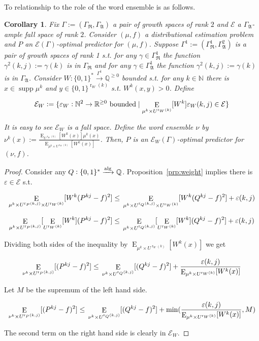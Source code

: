 \documentclass{article}
\numberwithin{equation}{section}
\theoremstyle{definition}
\theoremstyle{plain}
\newtheorem{corollary}{Corollary}[section]
\newcommand{\Words}{{\{ 0, 1 \}^*}}
\newcommand{\WordsLen}[1]{{\{ 0, 1 \}^{#1}}}
\DeclareMathOperator{\Supp}{supp}
\DeclareMathOperator{\E}{E}
\DeclareMathOperator{\R}{r}
\newcommand{\Nats}{\mathbb{N}}
\newcommand{\Rats}{\mathbb{Q}}
\newcommand{\Reals}{\mathbb{R}}
\newcommand{\GrowR}{\Gamma_{\mathfrak{R}}}
\newcommand{\GrowA}{\Gamma_{\mathfrak{A}}}
\newcommand{\Grow}{\Gamma:=(\GrowR,\GrowA)}
\newcommand{\Fall}{\mathcal{E}}
\newcommand{\Alg}{\xrightarrow{\textnormal{alg}}}
\begin{document}
To relationship to the role of the word ensemble is as follows.

\begin{samepage}
\begin{corollary}

Fix $\Grow$ a pair of growth spaces of rank $2$ and $\Fall$ a $\GrowA$-ample fall space of rank $2$. Consider $(\mu,f)$ a distributional estimation problem and $P$ an $\Fall(\Gamma)$-optimal predictor for $(\mu,f)$. Suppose $\Gamma^1:=(\GrowR^1,\GrowA^2)$ is a pair of growth spaces of rank 1 s.t. for any $\gamma \in \GrowR^1$ the function ${\gamma^2(k,j):=\gamma(k)}$ is in $\GrowR$ and for any $\gamma \in \GrowA^1$ the function $\gamma^2(k,j):=\gamma(k)$ is in $\GrowA$. Consider ${W: \Words \xrightarrow{\Gamma^1} \Rats^{\geq 0}}$ bounded s.t. for any $k \in \Nats$ there is $x \in \Supp \mu^k$ and $y \in \WordsLen{\R_W(k)}$ s.t. $W^k(x,y) > 0$. Define 

$${\Fall_W:=\{\varepsilon_W: \Nats^2 \rightarrow \Reals^{\geq 0} \textnormal{ bounded} \mid  \E_{\mu^k \times U^{\R_W(k)}}[W^k]\varepsilon_W(k,j) \in \Fall\}}$$

It is easy to see $\Fall_W$ is a fall space. Define the word ensemble $\nu$ by ${\nu^k(x):=\frac{\E_{U^{\R_W(k)}}[W^k(x)] \mu^k(x)}{\E_{\mu^k \times U^{\R_W(k)}}[W^k(x)]}}$. Then, $P$ is an $\Fall_W(\Gamma)$-optimal predictor for $(\nu,f)$.

\end{corollary}
\end{samepage}

\begin{proof}

Consider any $Q: \Words \Alg \Rats$. Proposition~\ref{prp:weight} implies there is $\varepsilon \in \Fall$ s.t.

$$\E_{\mu^k \times U^{\R_P(k,j)} \times U^{\R_W(k)}}[W^k(P^{kj} - f)^2] \leq \\ \E_{\mu^k \times U^{\R_Q(k,j)} \times U^{\R_W(k)}}[W^k(Q^{kj} - f)^2] + \varepsilon(k,j)$$

$$\E_{\mu^k \times U^{\R_P(k,j)}}[\E_{U^{\R_W(k)}}[W^k](P^{kj} - f)^2] \leq \\ \E_{\mu^k \times U^{\R_Q(k,j)}}[\E_{U^{\R_W(k)}}[W^k](Q^{kj} - f)^2] + \varepsilon(k,j)$$

Dividing both sides of the inequality by $\E_{\mu^k \times U^{\R_W(k)}}[W^k(x)]$ we get

$$\E_{\nu^k \times U^{\R_P(k,j)}}[(P^{kj} - f)^2] \leq \\ \E_{\nu^k \times U^{\R_Q(k,j)}}[(Q^{kj} - f)^2] + \frac{\varepsilon(k,j)}{\E_{\mu^k \times U^{\R_W(k)}}[W^k(x)]}$$

Let $M$ be the supremum of the left hand side.

$$\E_{\nu^k \times U^{\R_P(k,j)}}[(P^{kj} - f)^2] \leq \\ \E_{\nu^k \times U^{\R_Q(k,j)}}[(Q^{kj} - f)^2] + \min(\frac{\varepsilon(k,j)}{\E_{\mu^k \times U^{\R_W(k)}}[W^k(x)]},M)$$

The second term on the right hand side is clearly in $\Fall_W$.

\end{proof}
\end{document}
